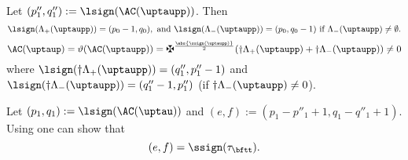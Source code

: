 \documentclass[ssunip]{subfiles}
\begin{document}




Let $(p''_{1},q''_{1}) := \lsign(\oAC{\uptaupp})$.
Then
\begin{equation}\label{eq:lsign.1}
\lsign(\pAC{\uptaupp}) = (p_{0}-1,q_{0}), \text{ and }
\lsign(\nAC{\uptaupp})=(p_{0},q_{0}-1) \text{ if } \nAC{\uptaupp}\neq \emptyset.
\end{equation}
\begin{equation}\label{eq:LS.taup}
  \oAC{\uptaup} = \vartheta(\oAC{\uptaupp}) = \maltese^{\frac{\abs{\ssign(\uptaupp)}}{2}}
  (\dagger \pAC{\uptaupp} + \dagger \nAC{\uptaupp}) \neq 0
\end{equation}
where
$\lsign(\dagger\pAC{\uptaupp}) = (q''_{1}, p''_{1}-1)$ and
$\lsign(\dagger\nAC{\uptaupp})=(q''_{1}-1,p''_{1})$ (if
$\dagger\nAC{\uptaupp}\neq 0$).

Let $(p_{1},q_{1}) := \lsign(\oAC{\uptau})$ and
$(e,f):=(p_{1}-p''_{1}+1, q_{1}-q''_{1}+1)$. Using 
one can show that
\[
  (e,f)=\ssign(\tau_{\bftt}).
\]

\end{document}
